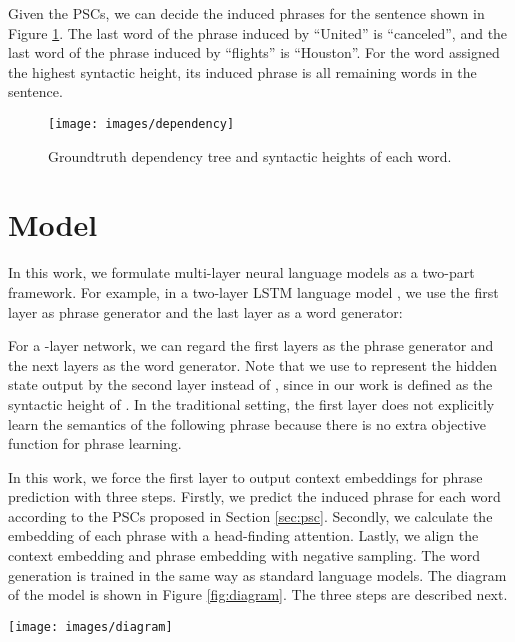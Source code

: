 \documentclass[11pt,a4paper]{article}
\begin{document}
Given the PSCs, we can decide the induced phrases for the sentence shown in Figure \ref{fig:dt}. The last word of the phrase induced by ``United'' is ``canceled'', and the last word of the phrase induced by ``flights'' is ``Houston''. For the word assigned the highest syntactic height, its induced phrase is all remaining words in the sentence.

\begin{figure}[t]
\centering
\texttt{[image: images/dependency]}
\caption{Groundtruth dependency tree and syntactic heights of each word.}
\label{fig:dt}
\end{figure}

\section{Model}
In this work, we formulate multi-layer neural language models as a two-part framework. For example, in a two-layer LSTM language model \cite{merity2017regularizing}, we use the first layer as phrase generator and the last layer as a word generator:




For a -layer network, we can regard the first  layers as the phrase generator and the next  layers as the word generator. Note that we use  to represent the hidden state output by the second layer instead of , since  in our work is defined as the syntactic height of . In the traditional setting, the first layer does not explicitly learn the semantics of the following phrase because there is no extra objective function for phrase learning.

In this work, we force the first layer to output context embeddings  for phrase prediction with three steps. Firstly, we predict the induced phrase for each word according to the PSCs proposed in Section \ref{sec:psc}. Secondly, we calculate the embedding of each phrase with a head-finding attention. Lastly, we align the context embedding and phrase embedding with negative sampling. The word generation is trained in the same way as standard language models. The diagram of the model is shown in Figure \ref{fig:diagram}.
The three steps are described next. 

\begin{figure*}[t]
\centering
\texttt{[image: images/diagram]}
\caption{The 3-step diagram of our approach. The current target word is ``the'', the induced phrase is ``morning flights'', and the next word is ``morning''. The context-phrase and context-word alignments are jointly trained.}
\label{fig:diagram}
\end{figure*}
\end{document}

